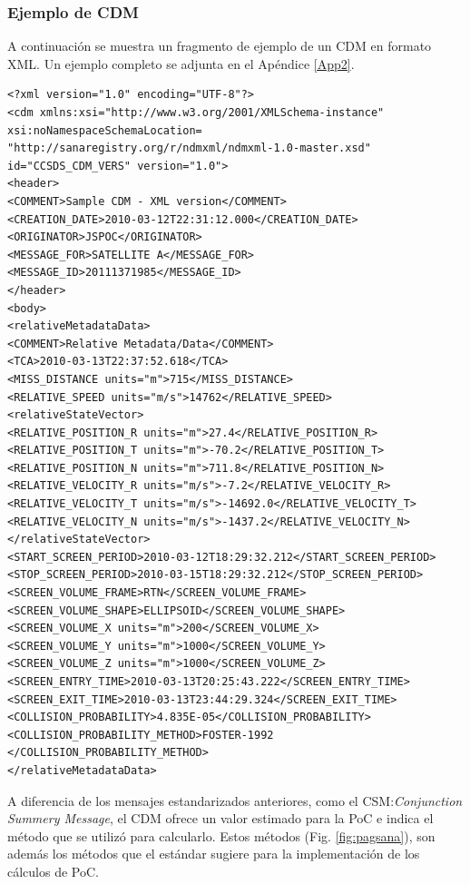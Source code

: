 \begin{center}
\end{center}


\subsubsection*{Ejemplo de CDM}
A continuaci\'on se muestra un fragmento de ejemplo de un CDM en formato XML. Un ejemplo completo se adjunta en el Ap\'endice \ref{App2}.\\

\lstset{language=XML,basicstyle=\small}
\begin{lstlisting}
<?xml version="1.0" encoding="UTF-8"?>
<cdm xmlns:xsi="http://www.w3.org/2001/XMLSchema-instance"
xsi:noNamespaceSchemaLocation=
"http://sanaregistry.org/r/ndmxml/ndmxml-1.0-master.xsd"
id="CCSDS_CDM_VERS" version="1.0">
<header>
<COMMENT>Sample CDM - XML version</COMMENT>
<CREATION_DATE>2010-03-12T22:31:12.000</CREATION_DATE>
<ORIGINATOR>JSPOC</ORIGINATOR>
<MESSAGE_FOR>SATELLITE A</MESSAGE_FOR>
<MESSAGE_ID>20111371985</MESSAGE_ID>
</header>
<body>
<relativeMetadataData>
<COMMENT>Relative Metadata/Data</COMMENT>
<TCA>2010-03-13T22:37:52.618</TCA>
<MISS_DISTANCE units="m">715</MISS_DISTANCE>
<RELATIVE_SPEED units="m/s">14762</RELATIVE_SPEED>
<relativeStateVector>
<RELATIVE_POSITION_R units="m">27.4</RELATIVE_POSITION_R>
<RELATIVE_POSITION_T units="m">-70.2</RELATIVE_POSITION_T>
<RELATIVE_POSITION_N units="m">711.8</RELATIVE_POSITION_N>
<RELATIVE_VELOCITY_R units="m/s">-7.2</RELATIVE_VELOCITY_R>
<RELATIVE_VELOCITY_T units="m/s">-14692.0</RELATIVE_VELOCITY_T>
<RELATIVE_VELOCITY_N units="m/s">-1437.2</RELATIVE_VELOCITY_N>
</relativeStateVector>
<START_SCREEN_PERIOD>2010-03-12T18:29:32.212</START_SCREEN_PERIOD>
<STOP_SCREEN_PERIOD>2010-03-15T18:29:32.212</STOP_SCREEN_PERIOD>
<SCREEN_VOLUME_FRAME>RTN</SCREEN_VOLUME_FRAME>
<SCREEN_VOLUME_SHAPE>ELLIPSOID</SCREEN_VOLUME_SHAPE>
<SCREEN_VOLUME_X units="m">200</SCREEN_VOLUME_X>
<SCREEN_VOLUME_Y units="m">1000</SCREEN_VOLUME_Y>
<SCREEN_VOLUME_Z units="m">1000</SCREEN_VOLUME_Z>
<SCREEN_ENTRY_TIME>2010-03-13T20:25:43.222</SCREEN_ENTRY_TIME>
<SCREEN_EXIT_TIME>2010-03-13T23:44:29.324</SCREEN_EXIT_TIME>
<COLLISION_PROBABILITY>4.835E-05</COLLISION_PROBABILITY>
<COLLISION_PROBABILITY_METHOD>FOSTER-1992
</COLLISION_PROBABILITY_METHOD>
</relativeMetadataData>
\end{lstlisting}

A diferencia de los mensajes estandarizados anteriores, como el CSM:{\it{Conjunction Summery Message}}, el CDM ofrece un valor estimado para la PoC e indica el m\'etodo que se utiliz\'o para calcularlo. Estos m\'etodos (Fig. \ref{fig:pagsana}), son adem\'as los m\'etodos que el est\'andar sugiere para la implementaci\'on de los c\'alculos de PoC.\\

